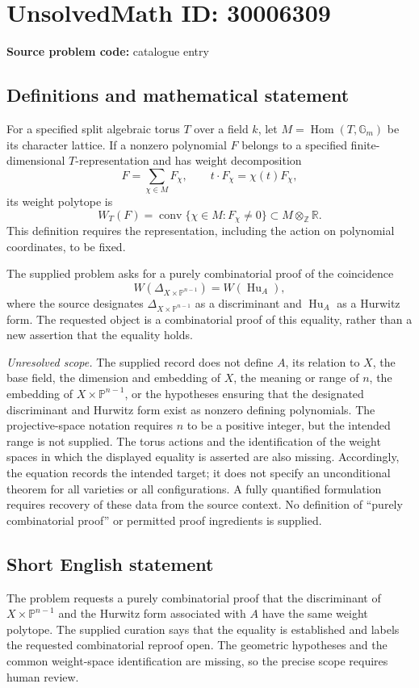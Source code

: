 \documentclass[11pt]{article}
\newcommand{\Z}{\mathbb{Z}}
\newcommand{\R}{\mathbb{R}}
\begin{document}
\section*{UnsolvedMath ID: 30006309}
\textbf{Source problem code:} catalogue entry
\subsection{Definitions and mathematical statement}
For a specified split algebraic torus \(T\) over a field \(k\), let \(M=\operatorname{Hom}(T,\mathbb G_m)\) be its character lattice. If a nonzero polynomial \(F\) belongs to a specified finite-dimensional \(T\)-representation and has weight decomposition
\[
F=\sum_{\chi\in M}F_\chi,\qquad t\cdot F_\chi=\chi(t)F_\chi,
\]
its weight polytope is
\[
W_T(F)=\operatorname{conv}\{\chi\in M:F_\chi\ne0\}\subset M\otimes_{\Z}\R.
\]
This definition requires the representation, including the action on polynomial coordinates, to be fixed.

The supplied problem asks for a purely combinatorial proof of the coincidence
\[
W\!\left(\Delta_{X\times\mathbb P^{n-1}}\right)
=
W\!\left(\operatorname{Hu}_A\right),
\]
where the source designates \(\Delta_{X\times\mathbb P^{n-1}}\) as a discriminant and \(\operatorname{Hu}_A\) as a Hurwitz form. The requested object is a combinatorial proof of this equality, rather than a new assertion that the equality holds.

\emph{Unresolved scope.} The supplied record does not define \(A\), its relation to \(X\), the base field, the dimension and embedding of \(X\), the meaning or range of \(n\), the embedding of \(X\times\mathbb P^{n-1}\), or the hypotheses ensuring that the designated discriminant and Hurwitz form exist as nonzero defining polynomials. The projective-space notation requires \(n\) to be a positive integer, but the intended range is not supplied. The torus actions and the identification of the weight spaces in which the displayed equality is asserted are also missing. Accordingly, the equation records the intended target; it does not specify an unconditional theorem for all varieties or all configurations. A fully quantified formulation requires recovery of these data from the source context. No definition of ``purely combinatorial proof'' or permitted proof ingredients is supplied.
\subsection{Short English statement}
The problem requests a purely combinatorial proof that the discriminant of \(X\times\mathbb P^{n-1}\) and the Hurwitz form associated with \(A\) have the same weight polytope. The supplied curation says that the equality is established and labels the requested combinatorial reproof open. The geometric hypotheses and the common weight-space identification are missing, so the precise scope requires human review.
\end{document}

